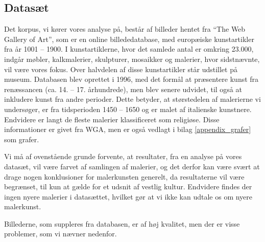 {\subsection{Datasæt}
Det korpus, vi kører vores analyse på, består af billeder hentet fra
``The Web Gallery of Art''\cite{wgahu}, som er en online billededatabase, med
europæiske kunstartikler fra år 1001 -- 1900. I kunstartiklerne, hvor
det samlede antal er omkring 23.000, indgår møbler, kalkmalerier,
skulpturer, mosaikker og malerier, hvor sidstnævnte, vil være vores
fokus. Over halvdelen af disse kunstartikler står udstillet på museum.
Databasen blev oprettet i 1996, med det formål at præsentere kunst fra
renæssancen (ca.  14. -- 17.  århundrede), men blev senere udvidet, til
også at inkludere kunst fra andre perioder. Dette betyder, at
størstedelen af malerierne vi undersøger, er fra tidsperioden 1450 --
1650 og er malet af italienske kunstnere. Endvidere er langt de fleste
malerier klassificeret som religiøse.  Disse informationer er givet fra
WGA, men er også vedlagt i bilag \ref{appendix_grafer} som
grafer.

Vi må af ovenstående grunde forvente, at resultater, fra en analyse på
vores datasæt, vil være farvet af samlingen af malerier, og det derfor
kan være svært at drage nogen konklusioner for malerkunsten generelt, da
resultaterne vil være begrænset, til kun at gælde for et udsnit af
vestlig kultur. Endvidere findes der ingen nyere malerier i datasættet,
hvilket gør at vi ikke kan udtale os om nyere malerkunst.

Billederne, som suppleres fra databasen, er af høj kvalitet, men der er
visse problemer, som vi nævner nedenfor.

}
